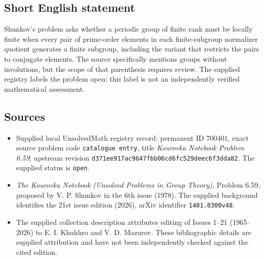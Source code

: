 \documentclass[11pt]{article}
\begin{document}
\subsection{Short English statement}
Shunkov's problem asks whether a periodic group of finite rank must be locally finite when every pair of prime-order elements in each finite-subgroup normalizer quotient generates a finite subgroup, including the variant that restricts the pairs to conjugate elements. The source specifically mentions groups without involutions, but the scope of that parenthesis requires review. The supplied registry labels the problem open; this label is not an independently verified mathematical assessment.
\subsection{Sources}
\begin{itemize}
\item Supplied local UnsolvedMath registry record: permanent ID \(700401\), exact source problem code \texttt{catalogue entry}, title \emph{Kourovka Notebook Problem 6.59}; upstream revision \texttt{d371ee917ac9647fbb06cd6fc529deec6f3dda82}. The supplied status is \texttt{open}.
\item \emph{The Kourovka Notebook (Unsolved Problems in Group Theory)}, Problem 6.59, proposed by V. P. Shunkov in the 6th issue (1978). The supplied background identifies the 21st issue edition (2026), arXiv identifier \texttt{1401.0300v48}.
\item The supplied collection description attributes editing of Issues 1--21 (1965--2026) to E. I. Khukhro and V. D. Mazurov. These bibliographic details are supplied attribution and have not been independently checked against the cited edition.
\end{itemize}
\end{document}
